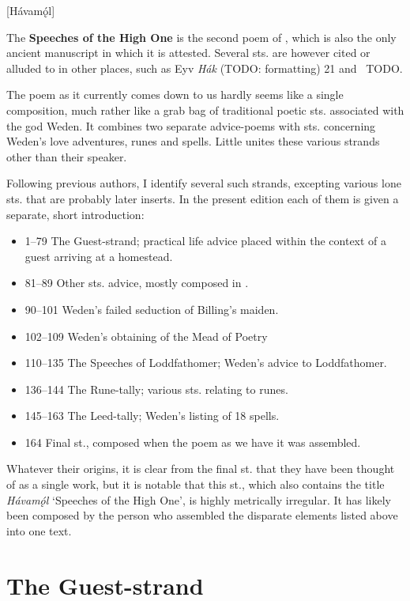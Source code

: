 [Hávamǫ́l]


The \textbf{Speeches of the High One} is the second poem of \Regius, which is also the only ancient manuscript in which it is attested. Several sts. are however cited or alluded to in other places, such as Eyv \emph{Hák} (TODO: formatting) 21 and \FostrbroedhraSaga\ TODO.

The poem as it currently comes down to us hardly seems like a single composition, much rather like a grab bag of traditional poetic sts. associated with the god Weden. It combines two separate advice-poems with sts. concerning Weden’s love adventures, runes and spells. Little unites these various strands other than their speaker.

Following previous authors, I identify several such strands, excepting various lone sts. that are probably later inserts. In the present edition each of them is given a separate, short introduction:

\begin{itemize}
  \item 1–79 The Guest-strand; practical life advice placed within the context of a guest arriving at a homestead.
  \item 81–89 Other sts. advice, mostly composed in \Fornyrdislag.
  \item 90–101 Weden’s failed seduction of Billing’s maiden.
  \item 102–109 Weden’s obtaining of the Mead of Poetry
  \item 110–135 The Speeches of Loddfathomer; Weden’s advice to Loddfathomer.
  \item 136–144 The Rune-tally; various sts. relating to runes.
  \item 145–163 The Leed-tally; Weden’s listing of 18 spells.
  \item 164 Final st., composed when the poem as we have it was assembled.
\end{itemize}

Whatever their origins, it is clear from the final st. that they have been thought of as a single work, but it is notable that this st., which also contains the title \emph{Hávamǫ́l} ‘Speeches of the High One’, is highly metrically irregular. It has likely been composed by the person who assembled the disparate elements listed above into one text.

\sectionline

\section{The Guest-strand}

